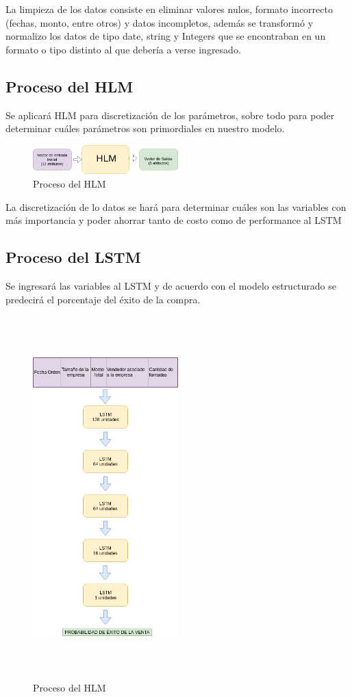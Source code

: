 \documentclass[conference]{IEEEtran}
\begin{document}
La limpieza de los datos consiste en eliminar valores nulos, formato incorrecto (fechas, monto, entre otros) y datos incompletos, además se transformó y normalizo los datos de tipo date, string y Integers que se encontraban en un formato o tipo distinto al que debería a verse ingresado.
\subsection{Proceso del HLM}
Se aplicará HLM para discretización de los parámetros, sobre todo para poder determinar cuáles parámetros son primordiales en nuestro modelo.
\begin{figure}[H]
    \centering
    \includegraphics[width=0.5\textwidth]{HLM}
    \caption{Proceso del HLM}
    \label{fig:proceso_hlm}
\end{figure}
La discretización de lo datos se hará para determinar cuáles son las variables con más importancia y poder ahorrar tanto de costo como de performance al LSTM
\subsection{Proceso del LSTM}
Se ingresará las variables al LSTM y de acuerdo con el modelo estructurado se predecirá el porcentaje del éxito de la compra.
\begin{figure}[H]
    \centering
    \includegraphics[width=0.5\textwidth,height=14cm]{LSTM}
    \caption{Proceso del HLM}
    \label{fig:proceso_lstm}
\end{figure}
\end{document}
